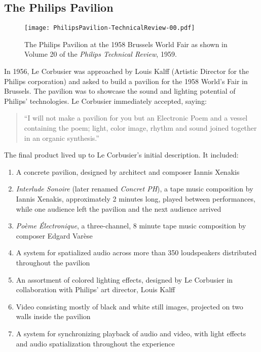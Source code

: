 \subsection{The Philips Pavilion}
\label{sec:philips-pavilion-1}
\begin{figure}[h]
  \texttt{[image: PhilipsPavilion-TechnicalReview-00.pdf]}
  \caption{The Philips Pavilion at the 1958 Brussels World Fair as
    shown in Volume 20 of the \textit{Philips Technical Review}, 1959.}
  \label{fig:philips-pavilion-photo}
\end{figure}
In 1956, Le Corbusier was approached by Louis Kalff (Artistic Director
for the Philips corporation) and asked to build a pavilion for the
1958 World's Fair in Brussels. The pavilion was to showcase the sound
and lighting potential of Philips' technologies. Le Corbusier
immediately accepted, saying:
\begin{quotation}
  ``I will not make a pavilion for you but an Electronic Poem and a
  vessel containing the poem; light, color image, rhythm and sound
  joined together in an organic synthesis.''\cite[-5mm]{Lopez2011} 
\end{quotation}
The final product lived up to Le Corbusier's initial description. It
included:\cite{Lombardo2009}
\begin{enumerate}
\item A concrete pavilion, designed by architect and composer Iannis
  Xenakis
\item \textit{Interlude Sonoire} (later renamed \textit{Concret PH}), a
  tape music composition by Iannis Xenakis, approximately 2 minutes
  long, played between performances, while one audience left the
  pavilion and the next audience arrived
\item \textit{Po\`{e}me \'{E}lectronique}, a three-channel, 8 minute
  tape music composition by composer Edgard Var\`{e}se
\item A system for spatialized audio across more than 350 loudspeakers
  distributed throughout the pavilion
\item An assortment of colored lighting effects, designed by Le Corbusier in
  collaboration with Philips' art director, Louis Kalff
\item Video consisting mostly of black and white still images,
  projected on two walls inside the pavilion
\item A system for synchronizing playback of audio and video,
  with light effects and audio spatialization throughout the
  experience
\end{enumerate} 

